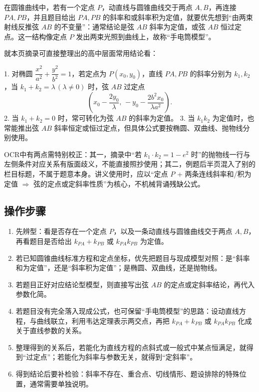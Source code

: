 \documentclass[UTF8,a4paper,11pt]{ctexart}
\begin{document}
在圆锥曲线中，若有一个定点 $P$，动直线与圆锥曲线交于两点 $A,B$，再连接 $PA,PB$，并且题目给出 $PA,PB$ 的斜率和或斜率积为定值，就要优先想到“由两束射线反推弦 $AB$ 的不变量”：通常结论是弦 $AB$ 斜率为定值，或弦 $AB$ 恒过定点。这一结构像定点 $P$ 发出两束光照到曲线上，故称“手电筒模型”。

就本页摘录可直接整理出的高中层面常用结论看：

1. 对椭圆 $\dfrac{x^2}{a^2}+\dfrac{y^2}{b^2}=1$，若定点为 $P(x_0,y_0)$，直线 $PA,PB$ 的斜率分别为 $k_1,k_2$，当 $k_1+k_2=\lambda\,(\lambda\ne 0)$ 时，弦 $AB$ 过定点
\[
\left(x_0-\frac{2y_0}{\lambda},\,-y_0-\frac{2b^2x_0}{\lambda a^2}\right).
\]
2. 当 $k_1+k_2=0$ 时，常可转化为弦 $AB$ 的斜率为定值。
3. 当 $k_1k_2$ 为定值时，也常能推出弦 $AB$ 斜率恒定或恒过定点，但具体公式要按椭圆、双曲线、抛物线分别使用。

OCR中有两点需特别校正：其一，摘录中“若 $k_1\cdot k_2=1-e^2$ 时”的抛物线一行与左侧条件对应关系有版面歧义，不能直接照抄使用；其二，例题后半页混入了别的栏目标题，不属于题意本身。讲义使用时，应以“定点 $P$ + 两条连线斜率和/积为定值 $\Rightarrow$ 弦的定点或定斜率性质”为核心，不机械背诵残缺公式。

\subsection*{操作步骤}

\begin{enumerate}

\item 先辨型：看是否存在一个定点 $P$，以及一条动直线与圆锥曲线交于两点 $A,B$，再看题目是否给出 $k_{PA}+k_{PB}$ 或 $k_{PA}k_{PB}$ 为定值。

\item 若已知圆锥曲线标准方程和定点坐标，优先把题目与现成模型对照：是“斜率和为定值”，还是“斜率积为定值”；是椭圆、双曲线，还是抛物线。

\item 若题目正好对应结论型模型，则直接写出弦 $AB$ 的定点或定斜率结论，再代入参数化简。

\item 若题目没有完全落入现成公式，也可保留“手电筒模型”的思路：设动直线方程，与曲线联立，利用韦达定理表示两交点，再把 $k_{PA}+k_{PB}$ 或 $k_{PA}k_{PB}$ 化成关于直线参数的关系。

\item 整理得到的关系后，若能化为直线方程的点斜式或一般式中某点恒满足，就得到“过定点”；若能化为斜率与参数无关，就得到“定斜率”。

\item 得到结论后要补检验：斜率不存在、重合点、切线情形、题设排除的特殊位置，通常需要单独说明。

\end{enumerate}
\end{document}
